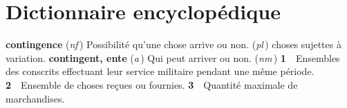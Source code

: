
\section{Dictionnaire encyclopédique}

{\bf contingence} ({\it nf}\,)  Possibilité qu'une chose arrive ou non. ({\it pl}\,) choses sujettes à variation.
{\bf contingent, ente} ({\it a}\,) Qui peut arriver ou non.  ({\it nm}\,) {\bf 1}\ \ Ensembles des conscrits effectuant leur service militaire pendant une même période. {\bf 2}\ \ Ensemble de choses reçues ou fournies. {\bf 3}\ \ Quantité maximale de marchandises.
